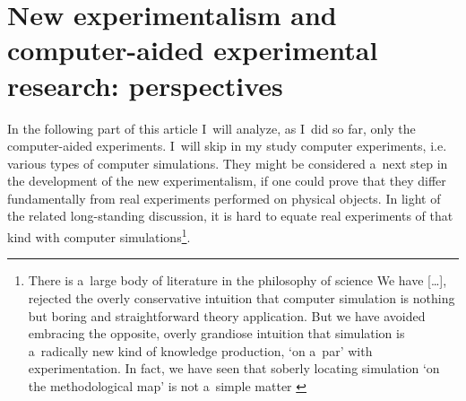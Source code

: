 \section{New experimentalism and computer-aided experimental research: perspectives}

In the following part of this article I~will analyze, as I~did so far, only the computer-aided experiments. I~will skip in my study computer experiments, i.e. various types of computer simulations. They might be considered a~next step in the development of the new experimentalism, if one could prove that they differ fundamentally from real experiments performed on physical objects. In light of the related long-standing discussion, it is hard to equate real experiments of that kind with computer simulations\footnote{There is a~large body of literature in the philosophy of science \label{ref:RNDsTCp7JYcgx}We have […], rejected the overly conservative intuition that computer simulation is nothing but boring and straightforward theory application. But we have avoided embracing the opposite, overly grandiose intuition that simulation is a~radically new kind of knowledge production, ‘on a~par' with experimentation. In fact, we have seen that soberly locating simulation ‘on the methodological map' is not a~simple matter 
\parencites[][]{kaufmann_supercomputing_1993}[][]{humphreys_computational_1995}[][]{morgan_ising_1999}[][]{miller_why_2001}[][]{guala_models_2002}[][]{guala_paradigmatic_2008}[][]{morgan_experiments_2003}[][]{gilbert_simulation_2005}[][]{giere_is_2009}[][]{morrison_models_2009}[][]{parker_does_2009}[][]{parker_computer_2017}[][]{peschard_modeling_2009}[][]{winsberg_tale_2009}[][]{parke_experiments_2014}%
 }.



